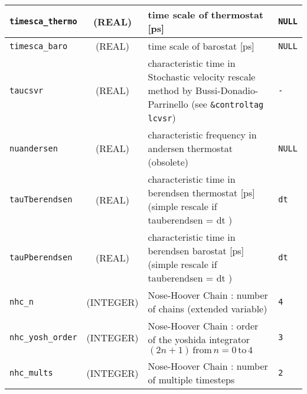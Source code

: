 \documentclass[a4paper]{article}
\begin{document}
\begin{longtable}{l|c|m{8cm}|m{2cm}}
\hline
\rule[-0.75cm]{0cm}{1.5cm}
\verb?timesca_thermo? 
                 & (REAL)             &  time scale of thermostat [ps]                                                      & \verb?NULL? \\
\hline
\rule[-0.75cm]{0cm}{1.5cm}
\verb?timesca_baro?   
                 & (REAL)             &   time scale of barostat [ps]                                                       & \verb?NULL? \\
\hline
\rule[-0.75cm]{0cm}{1.5cm}
\verb?taucsvr?   & (REAL)             &  characteristic time in Stochastic velocity rescale method by 
                                         Bussi-Donadio-Parrinello (see \verb?&controltag lcvsr?)                            & \verb?-? \\
\hline
\rule[-0.75cm]{0cm}{1.5cm}
\verb?nuandersen?     
                 & (REAL)             &  characteristic frequency in andersen thermostat (obsolete)                         & \verb?NULL? \\
\hline
\rule[-0.75cm]{0cm}{1.5cm}
\verb?tauTberendsen?  
                 & (REAL)             &  characteristic time in berendsen thermostat [ps] 
                                         (simple rescale if tauberendsen = dt )                                             & \verb?dt? \\
\hline
\rule[-0.75cm]{0cm}{1.5cm}
\verb?tauPberendsen?  
                 & (REAL)             &  characteristic time in berendsen barostat [ps]
                                         (simple rescale if tauberendsen = dt )                                             & \verb?dt? \\
\hline
\rule[-0.75cm]{0cm}{1.5cm}
\verb?nhc_n?     & (INTEGER)          &  Nose-Hoover Chain : number of chains (extended variable)                           & \verb?4? \\
\hline
\rule[-0.75cm]{0cm}{1.5cm}
\verb?nhc_yosh_order? 
                 & (INTEGER)          &  Nose-Hoover Chain : order of the yoshida integrator 
                                         $(2n+1) \, \mathrm{from}\, n=0\, \mathrm{to}\, 4$                                  & \verb?3? \\
\hline
\rule[-0.75cm]{0cm}{1.5cm}
\verb?nhc_mults?      
                 & (INTEGER)          &  Nose-Hoover Chain : number of multiple timesteps                                   & \verb?2? \\
\hline
\hline
\end{longtable}

\end{document}
